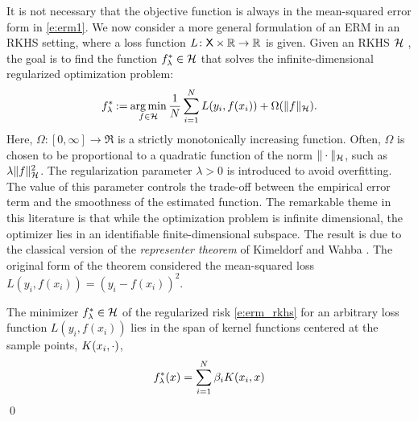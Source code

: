 It is not necessary that the objective function is always in the mean-squared error form in \eqref{e:erm1}. We now consider a more general formulation of an ERM in an RKHS setting, where a loss function $L \colon  {\sf X}\times \mathbb{R} \to\mathbb{R}$ is given.   Given an RKHS ${\cal H}$ ,   the goal is to find the function $f_\lambda^*\in{\cal H}$ that solves the infinite-dimensional regularized optimization problem:
\begin{equation}
f_\reg^* \eqdef \argmin_{f\in\clH} \frac{1}{N} \sum_{i=1}^N L(y_i,  f(x_i))     + \Omega(\| f\|_{\clH}).
\label{e:erm_rkhs}
\end{equation}
Here, $\Omega : [0, \infty] \to \Re$ is a strictly monotonically increasing function. Often, $\Omega$ is chosen to be proportional to a quadratic function of the norm $\|\cdot\|_{\cal H}$, such as $\lambda \|f\|^2_{\cal H}$.
The regularization parameter $\lambda>0$ is introduced to avoid overfitting. The value of this parameter controls the trade-off between the empirical error term and the smoothness of the estimated function.  
The remarkable theme in this literature is that while the optimization problem is infinite dimensional,  the optimizer lies in an identifiable finite-dimensional subspace.
The result is due to the classical version of the \textit{representer theorem} of Kimeldorf and Wahba \cite{kimwah71}. The original form of the theorem considered the mean-squared loss $L(y_i, f(x_i)) = (y_i - f(x_i))^2$.
\begin{theorem}
\label{theorem:rep_theorem}
The minimizer $f_\lambda^* \in {\cal H}$ of the regularized risk \eqref{e:erm_rkhs} for an arbitrary loss function $L(y_i, f(x_i))$ lies in the span of kernel functions centered at the sample points, $K(x_i, \cdot)$,
\[
f_\lambda^*(x) = \sum_{i=1}^N \beta_i K(x_i, x)
\]
\qed
\end{theorem}
